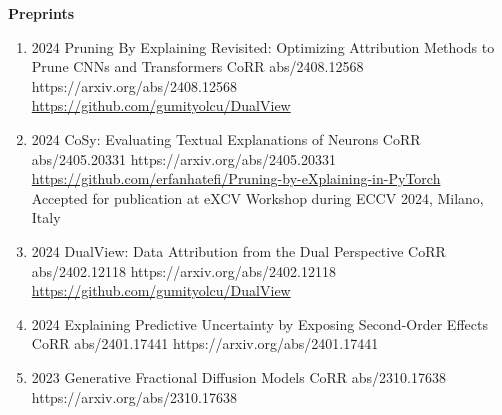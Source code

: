 \headedsection %
{\bf Preprints}{}
{
    \begin{enumerate}

        \item {}
                        {2024}
                        {Pruning By Explaining Revisited: Optimizing Attribution Methods to Prune CNNs and Transformers}
                        {CoRR abs/2408.12568}
                        {https://arxiv.org/abs/2408.12568}
                        {\\\href{https://github.com/gumityolcu/DualView}{https://github.com/gumityolcu/DualView}}

        \item {}
                        {2024}
                        {CoSy: Evaluating Textual Explanations of Neurons}
                        {CoRR abs/2405.20331}
                        {https://arxiv.org/abs/2405.20331}
                        {\\ \href{https://github.com/erfanhatefi/Pruning-by-eXplaining-in-PyTorch}{https://github.com/erfanhatefi/Pruning-by-eXplaining-in-PyTorch}\\
                        Accepted for publication at eXCV Workshop during ECCV 2024, Milano, Italy}

        \item {}
                        {2024}
                        {DualView: Data Attribution from the Dual Perspective}
                        {CoRR abs/2402.12118}
                        {https://arxiv.org/abs/2402.12118}
                        {\\\href{https://github.com/gumityolcu/DualView}{https://github.com/gumityolcu/DualView}}

        \item {}
                        {2024}
                        {Explaining Predictive Uncertainty by Exposing Second-Order Effects}
                        {CoRR abs/2401.17441}
                        {https://arxiv.org/abs/2401.17441}

        \item {}
                        {2023}
                        {Generative Fractional Diffusion Models}
                        {CoRR abs/2310.17638}
                        {https://arxiv.org/abs/2310.17638}


\end{enumerate}}
